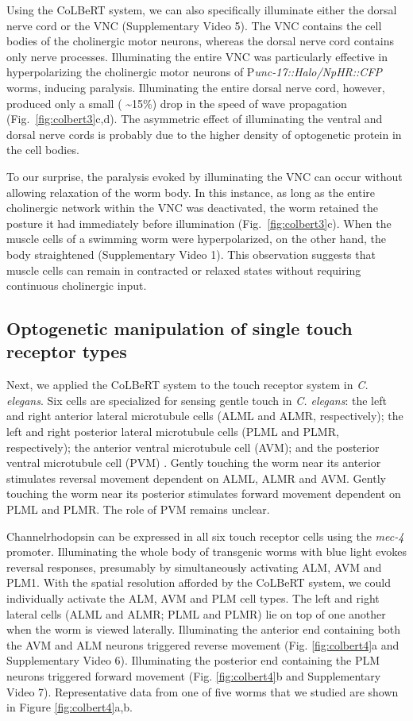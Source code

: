 Using the CoLBeRT system, we can also specifically illuminate either the dorsal nerve cord or the VNC (Supplementary Video 5). The VNC contains the cell bodies of the cholinergic motor neurons, whereas the dorsal nerve cord contains only nerve processes. Illuminating the entire VNC was particularly effective in hyperpolarizing the cholinergic motor neurons of P\textit{unc-17::Halo/NpHR::CFP} worms, inducing paralysis. Illuminating the entire dorsal nerve cord, however, produced only a small ( \textasciitilde15\%) drop in the speed of wave propagation (Fig.~\ref{fig:colbert3}c,d). The asymmetric effect of illuminating the ventral and dorsal nerve cords is probably due to the higher density of optogenetic protein in the cell bodies.

To our surprise, the paralysis evoked by illuminating the VNC can occur without allowing relaxation of the worm body. In this instance, as long as the entire cholinergic network within the VNC was deactivated, the worm retained the posture it had immediately before illumination (Fig.~\ref{fig:colbert3}c). When the muscle cells of a swimming worm were hyperpolarized, on the other hand, the body straightened (Supplementary Video 1). This observation suggests that muscle cells can remain in contracted or relaxed states without requiring continuous cholinergic input.


\subsection{Optogenetic manipulation of single touch receptor types}
Next, we applied the CoLBeRT system to the touch receptor system in \textit{C. elegans}. Six cells are specialized for sensing gentle touch in \textit{C. elegans}: the left and right anterior lateral microtubule cells (ALML and ALMR, respectively); the left and right posterior lateral microtubule cells (PLML and PLMR, respectively); the anterior ventral microtubule cell (AVM); and the posterior ventral microtubule cell (PVM) \citep{chalfie_neural_1985}. Gently touching the worm near its anterior stimulates reversal movement dependent on ALML, ALMR and AVM. Gently touching the worm near its posterior stimulates forward movement dependent on PLML and PLMR. The role of PVM remains unclear.

Channelrhodopsin can be expressed in all six touch receptor cells using the \textit{mec-4} promoter. Illuminating the whole body of transgenic worms with blue light evokes reversal responses, presumably by simultaneously activating ALM, AVM and PLM1. With the spatial resolution afforded by the CoLBeRT system, we could individually activate the ALM, AVM and PLM cell types. The left and right lateral cells (ALML and ALMR; PLML and PLMR) lie on top of one another when the worm is viewed laterally. Illuminating the anterior end containing both the AVM and ALM neurons triggered reverse movement (Fig. \ref{fig:colbert4}a and Supplementary Video 6). Illuminating the posterior end containing the PLM neurons triggered forward movement (Fig. \ref{fig:colbert4}b and Supplementary Video 7). Representative data from one of five worms that we studied are shown in Figure \ref{fig:colbert4}a,b.


